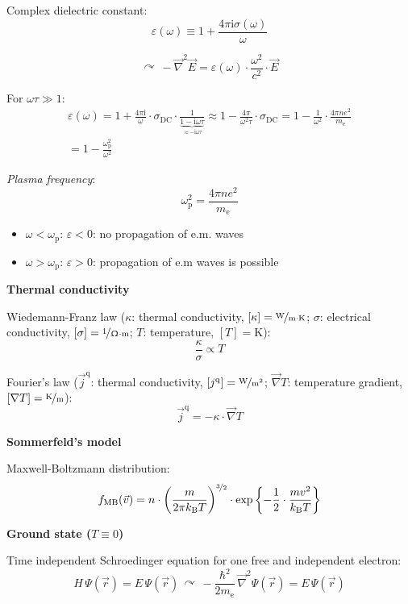\documentclass[fontsize=11pt,a4paper]{scrartcl}
\begin{document}
Complex dielectric constant:
\[
	\varepsilon(\omega)\equiv 1+\frac{4\pi\mathrm{i}\sigma(\omega)}{\omega}
\]

\[
	\curvearrowright\,-\vec\nabla^2\vec E=\varepsilon(\omega)\cdot\frac{\omega^2}{c^2}\cdot\vec E
\]

For $\omega\tau\gg 1$:
\begin{gather*}
	\varepsilon(\omega)=1+\frac{4\pi\mathrm{i}}{\omega}\cdot\sigma_\mathrm{DC}\cdot\frac{1}{\underbrace{1-\mathrm{i}\omega\tau}_{\approx-\mathrm{i}\omega\tau}}\approx 1-\frac{4\pi}{\omega^2\tau}\cdot\sigma_\mathrm{DC}=1-\frac{1}{\omega^2}\cdot\frac{4\pi ne^2}{m_\mathrm{e}}\\
	=1-\frac{\omega_\mathrm{p}^2}{\omega^2}
\end{gather*}

\emph{Plasma frequency}:
\[
	\omega_\mathrm{p}^2=\frac{4\pi ne^2}{m_\mathrm{e}}
\]

\begin{itemize}
	\item $\omega<\omega_\mathrm{p}$: $\varepsilon<0$: no propagation of e.m. waves
	\item $\omega>\omega_\mathrm{p}$: $\varepsilon>0$: propagation of e.m waves is possible
\end{itemize}

\textbf{\normalsize{Thermal conductivity}}

Wiedemann-Franz law ($\kappa$: thermal conductivity, $[\kappa]=\nicefrac{\mathrm{W}}{\mathrm{m}\cdot\mathrm{K}}$; $\sigma$: electrical conductivity, $[\sigma]=\nicefrac{1}{\Upomega\cdot\mathrm{m}}$; $T$: temperature, $[T]=\mathrm{K}$):
\[
	\frac{\kappa}{\sigma}\propto T
\]

Fourier's law ($\vec j^\mathrm{q}$: thermal conductivity, $[j^\mathrm{q}]=\nicefrac{\mathrm{W}}{\mathrm{m}^2}$; $\vec\nabla T$: temperature gradient,\\ $[\nabla T]=\nicefrac{\mathrm{K}}{\mathrm{m}}$):
\[
	\vec j^\mathrm{q}=-\kappa\cdot\vec\nabla T
\]

\textbf{\Large{Sommerfeld's model}}

Maxwell-Boltzmann distribution:
\[
	f_\mathrm{MB}(\vec v)=n\cdot\left(\frac{m}{2\pi k_\mathrm{B}T}\right)^{\nicefrac{3}{2}}\cdot\exp\left\{-\frac{1}{2}\cdot\frac{mv^2}{k_\mathrm{B}T}\right\}
\]

\textbf{\normalsize{Ground state ($T\equiv 0$)}}

Time independent Schroedinger equation for one free and independent electron:
\[
	H\,\Psi(\vec r)=E\,\Psi(\vec r)\,\curvearrowright\,-\frac{\hbar^2}{2m_\mathrm{e}}\,\vec\nabla^2\Psi(\vec r)=E\,\Psi(\vec r)
\]
\end{document}
